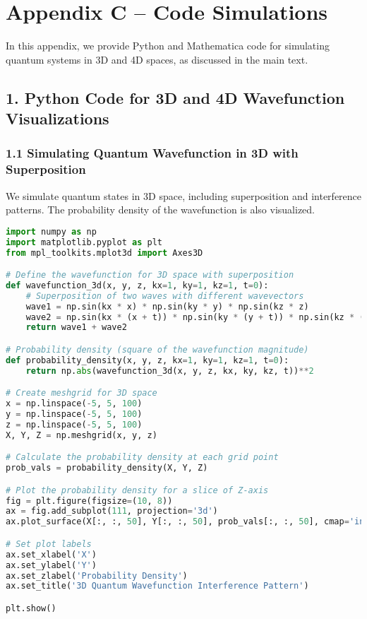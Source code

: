 \documentclass[12pt]{article}
\begin{document}
\section{Appendix C – Code Simulations}

In this appendix, we provide Python and Mathematica code for simulating quantum systems in 3D and 4D spaces, as discussed in the main text.

\subsection*{1. Python Code for 3D and 4D Wavefunction Visualizations}

\subsubsection*{1.1 Simulating Quantum Wavefunction in 3D with Superposition}

We simulate quantum states in 3D space, including superposition and interference patterns. The probability density of the wavefunction is also visualized.

\begin{lstlisting}[language=Python, caption={Python Code: Simulating Quantum Wavefunction in 3D with Superposition}]
import numpy as np
import matplotlib.pyplot as plt
from mpl_toolkits.mplot3d import Axes3D

# Define the wavefunction for 3D space with superposition
def wavefunction_3d(x, y, z, kx=1, ky=1, kz=1, t=0):
    # Superposition of two waves with different wavevectors
    wave1 = np.sin(kx * x) * np.sin(ky * y) * np.sin(kz * z)
    wave2 = np.sin(kx * (x + t)) * np.sin(ky * (y + t)) * np.sin(kz * (z + t))
    return wave1 + wave2

# Probability density (square of the wavefunction magnitude)
def probability_density(x, y, z, kx=1, ky=1, kz=1, t=0):
    return np.abs(wavefunction_3d(x, y, z, kx, ky, kz, t))**2

# Create meshgrid for 3D space
x = np.linspace(-5, 5, 100)
y = np.linspace(-5, 5, 100)
z = np.linspace(-5, 5, 100)
X, Y, Z = np.meshgrid(x, y, z)

# Calculate the probability density at each grid point
prob_vals = probability_density(X, Y, Z)

# Plot the probability density for a slice of Z-axis
fig = plt.figure(figsize=(10, 8))
ax = fig.add_subplot(111, projection='3d')
ax.plot_surface(X[:, :, 50], Y[:, :, 50], prob_vals[:, :, 50], cmap='inferno')

# Set plot labels
ax.set_xlabel('X')
ax.set_ylabel('Y')
ax.set_zlabel('Probability Density')
ax.set_title('3D Quantum Wavefunction Interference Pattern')

plt.show()
\end{lstlisting}
\end{document}
